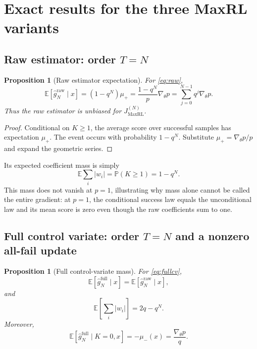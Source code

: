 \documentclass[11pt]{article}
\newcommand{\E}{\mathbb{E}}
\newcommand{\Prb}{\mathbb{P}}
\newcommand{\grad}{\nabla_{\!\theta}}
\newtheorem{proposition}[theorem]{Proposition}
\theoremstyle{definition}
\theoremstyle{remark}
\begin{document}
\section{Exact results for the three MaxRL variants}

\subsection{Raw estimator: order $T=N$}

\begin{proposition}[Raw estimator expectation]
For \cref{eq:raw},
\begin{equation}
\E[\widehat g_N^{\mathrm{raw}}\mid x]
=\left(1-q^N\right)\mu_+
=\frac{1-q^N}{p}\grad p
=\sum_{j=0}^{N-1}q^j\grad p.
\end{equation}
Thus the raw estimator is unbiased for $J_{\mathrm{MaxRL}}^{(N)}$.
\end{proposition}

\begin{proof}
Conditional on $K\ge1$, the average score over successful samples has expectation $\mu_+$. The event occurs with probability $1-q^N$. Substitute $\mu_+=\grad p/p$ and expand the geometric series.
\end{proof}

Its expected coefficient mass is simply
\[
\E\sum_i|w_i|=\Prb(K\ge1)=1-q^N.
\]
This mass does not vanish at $p=1$, illustrating why mass alone cannot be called the entire gradient: at $p=1$, the conditional success law equals the unconditional law and its mean score is zero even though the raw coefficients sum to one.

\subsection{Full control variate: order $T=N$ and a nonzero all-fail update}

\begin{proposition}[Full control-variate mass]
For \cref{eq:fullcv},
\begin{equation}
\E[\widehat g_N^{\mathrm{full}}\mid x]
=\E[\widehat g_N^{\mathrm{raw}}\mid x],
\end{equation}
and
\begin{equation}
\E\left[\sum_i|w_i|\right]
=2q-q^N.
\label{eq:fullcv-mass}
\end{equation}
Moreover,
\begin{equation}
\E[\widehat g_N^{\mathrm{full}}\mid K=0,x]
=-\mu_-(x)
=\frac{\grad p}{q}.
\label{eq:allfail-cv}
\end{equation}
\end{proposition}
\end{document}
